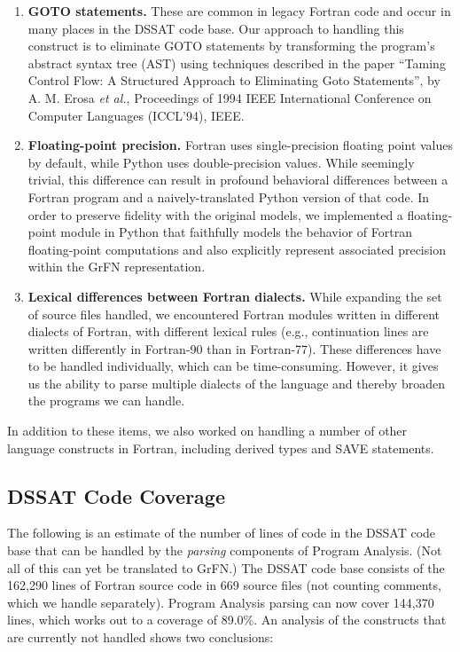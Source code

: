 \documentclass[article, 12pt, oneside]{memoir}
\begin{document}
\begin{enumerate}
\def\labelenumi{\arabic{enumi}.}
\item
  \textbf{GOTO statements.} These are common in legacy Fortran code and
  occur in many places in the DSSAT code base. Our approach to handling
  this construct is to eliminate GOTO statements by transforming the
  program's abstract syntax tree (AST) using techniques described in the
  paper ``Taming Control Flow: A Structured Approach to Eliminating Goto
  Statements'', by A. M. Erosa \emph{et al.}, Proceedings of 1994 IEEE
  International Conference on Computer Languages (ICCL'94), IEEE.
\item
  \textbf{Floating-point precision.} Fortran uses single-precision
  floating point values by default, while Python uses double-precision
  values. While seemingly trivial, this difference can result in
  profound behavioral differences between a Fortran program and a
  naively-translated Python version of that code. In order to preserve
  fidelity with the original models, we implemented a floating-point
  module in Python that faithfully models the behavior of Fortran
  floating-point computations and also explicitly represent associated
  precision within the GrFN representation.
\item
  \textbf{Lexical differences between Fortran dialects.} While expanding
  the set of source files handled, we encountered Fortran modules
  written in different dialects of Fortran, with different lexical rules
  (e.g., continuation lines are written differently in Fortran-90 than
  in Fortran-77). These differences have to be handled individually,
  which can be time-consuming. However, it gives us the ability to parse
  multiple dialects of the language and thereby broaden the programs we
  can handle.
\end{enumerate}

In addition to these items, we also worked on handling a number of other
language constructs in Fortran, including derived types and SAVE
statements.

\hypertarget{dssat-code-coverage}{%
\subsection{DSSAT Code Coverage}\label{dssat-code-coverage}}

The following is an estimate of the number of lines of code in the DSSAT
code base that can be handled by the \emph{parsing} components of
Program Analysis. (Not all of this can yet be translated to GrFN.) The
DSSAT code base consists of the 162,290 lines of Fortran source code in
669 source files (not counting comments, which we handle separately).
Program Analysis parsing can now cover 144,370 lines, which works out to
a coverage of 89.0\%. An analysis of the constructs that are currently
not handled shows two conclusions:
\end{document}
